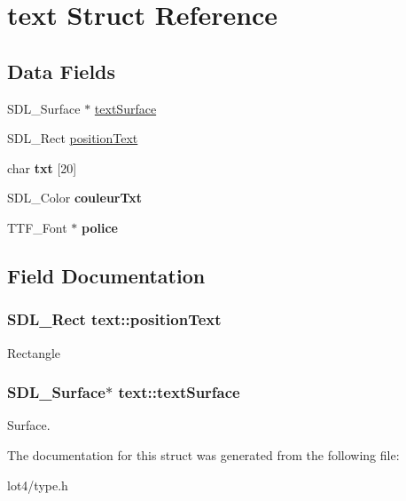 \hypertarget{structtext}{}\section{text Struct Reference}
\label{structtext}
\subsection*{Data Fields}
\begin{DoxyCompactItemize}
\item 
S\+D\+L\+\_\+\+Surface $\ast$ \hyperlink{structtext_a1a9992f493ebd8946dc5a736d65e8213}{text\+Surface}
\item 
S\+D\+L\+\_\+\+Rect \hyperlink{structtext_a01cc24369eccbe9ccb68af9a748315d3}{position\+Text}
\item 
char {\bfseries txt} \mbox{[}20\mbox{]}\hypertarget{structtext_afd7610607c0ade6ed450f86e275ddce5}{}\label{structtext_afd7610607c0ade6ed450f86e275ddce5}

\item 
S\+D\+L\+\_\+\+Color {\bfseries couleur\+Txt}\hypertarget{structtext_a0f3134d4dbc64c9b28fa625fb627f9c5}{}\label{structtext_a0f3134d4dbc64c9b28fa625fb627f9c5}

\item 
T\+T\+F\+\_\+\+Font $\ast$ {\bfseries police}\hypertarget{structtext_aec9ba02a1c093b1db8aa0f16ac092459}{}\label{structtext_aec9ba02a1c093b1db8aa0f16ac092459}

\end{DoxyCompactItemize}


\subsection{Field Documentation}
\subsubsection[{\texorpdfstring{position\+Text}{positionText}}]{\setlength{\rightskip}{0pt plus 5cm}S\+D\+L\+\_\+\+Rect text\+::position\+Text}\hypertarget{structtext_a01cc24369eccbe9ccb68af9a748315d3}{}\label{structtext_a01cc24369eccbe9ccb68af9a748315d3}
Rectangle 
\subsubsection[{\texorpdfstring{text\+Surface}{textSurface}}]{\setlength{\rightskip}{0pt plus 5cm}S\+D\+L\+\_\+\+Surface$\ast$ text\+::text\+Surface}\hypertarget{structtext_a1a9992f493ebd8946dc5a736d65e8213}{}\label{structtext_a1a9992f493ebd8946dc5a736d65e8213}
Surface. 

The documentation for this struct was generated from the following file\+:\begin{DoxyCompactItemize}
\item 
lot4/type.\+h\end{DoxyCompactItemize}
